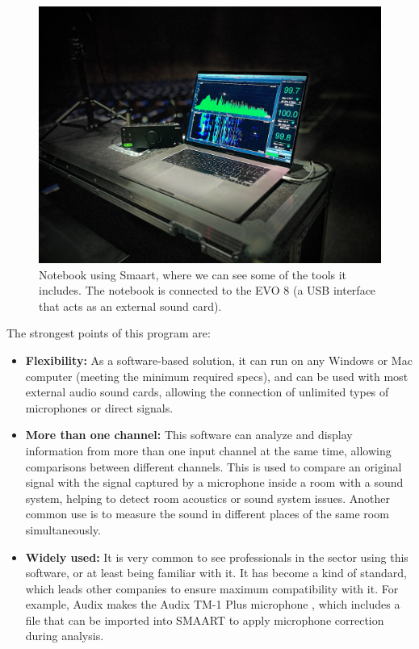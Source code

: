 \begin{figure}[H]
	\centering
	\includegraphics[width=0.9
	\linewidth]{Figures/smaart_01.png}
	\caption{Notebook using Smaart, where we can see some of the tools it includes. The notebook is connected to the EVO 8 (a USB interface that acts as an external sound card).}
	\label{fig:SMAART}
\end{figure}
	
The strongest points of this program are:

\begin{itemize}
	\item \textbf{Flexibility:} As a software-based solution, it can run on any Windows or Mac computer (meeting the minimum required specs), and can be used with most external audio sound cards, allowing the connection of unlimited types of microphones or direct signals.
	
	\item \textbf{More than one channel:} This software can analyze and display information from more than one input channel at the same time, allowing comparisons between different channels. This is used to compare an original signal with the signal captured by a microphone inside a room with a sound system, helping to detect room acoustics or sound system issues. Another common use is to measure the sound in different places of the same room simultaneously.
	
	\item \textbf{Widely used:} It is very common to see professionals in the sector using this software, or at least being familiar with it. It has become a kind of standard, which leads other companies to ensure maximum compatibility with it. For example, Audix makes the Audix TM-1 Plus microphone \cite{AudixTM1}, which includes a file that can be imported into SMAART to apply microphone correction during analysis.
\end{itemize}



